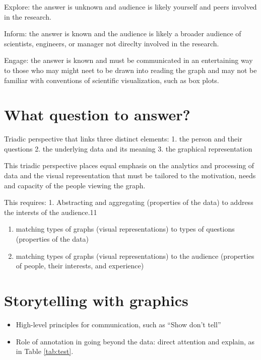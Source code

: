 \documentclass[]{krantz}
\providecommand{\tightlist}{%
  \setlength{\itemsep}{0pt}\setlength{\parskip}{0pt}}
\begin{document}
Explore: the answer is unknown and audience is likely yourself and peers involved in the research.

Inform: the answer is known and the audience is likely a broader audience of scientists, engineers, or manager not direclty involved in the research.

Engage: the answer is known and must be communicated in an entertaining way to those who may might neet to be drawn into reading the graph and may not be familiar with conventions of scientific visualization, such as box plots.

\hypertarget{what-question-to-answer}{%
\section{What question to answer?}\label{what-question-to-answer}}

Triadic perspective that links three distinct elements:
1. the person and their questions
2. the underlying data and its meaning
3. the graphical representation

This triadic perspective places equal emphasis on the analytics and processing of data and the visual representation that must be tailored to the motivation, needs and capacity of the people viewing the graph.

This requires:
1. Abstracting and aggregating (properties of the data) to address the intersts of the audience.11

\begin{enumerate}
\def\labelenumi{\arabic{enumi}.}
\setcounter{enumi}{1}
\item
  matching types of graphs (visual representations) to types of questions (properties of the data)
\item
  matching types of graphs (visual representations) to the audience (properties of people, their interests, and experience)
\end{enumerate}

\hypertarget{storytelling-with-graphics}{%
\section{Storytelling with graphics}\label{storytelling-with-graphics}}

\begin{itemize}
\tightlist
\item
  High-level principles for communication, such as ``Show don't tell''
\item
  Role of annotation in going beyond the data: direct attention and explain, as in Table \ref{tab:test}.
\end{itemize}
\end{document}
